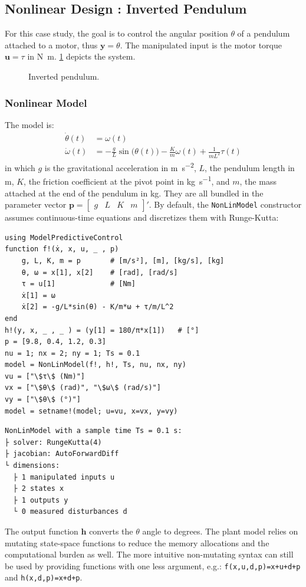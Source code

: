 \subsection{Nonlinear Design : Inverted Pendulum}
\label{sec.nonlinear_design}

For this case study, the goal is to control the angular position $\theta$ of a pendulum attached to a motor, thus $\mathbf{y} = \theta$. The manipulated input is the motor torque $\mathbf{u} = \tau$ in \si{\newton\meter}. \cref{fig:pendulum} depicts the system. 

\begin{figure}[ht]
    \centering
    
    \caption{Inverted pendulum.}\label{fig:pendulum}
\end{figure}

\subsubsection{Nonlinear Model}

The model is:
\begin{align}
\dot{\theta}(t) &= \omega(t) \\
\dot{\omega}(t) &= -\frac{g}{L}\sin\big(\theta(t)\big) -\frac{K}{m}\omega(t) + \frac{1}{m L^2}\tau(t) \label{eq.pendulum_speed}
\end{align}
in which $g$ is the gravitational acceleration in \si{\meter\per\second\squared}, $L$, the pendulum length in \si{\meter}, $K$, the friction coefficient at the pivot point in \si{\kilogram\per\second}, and $m$, the mass attached at the end of the pendulum in \si{\kilogram}. They are all bundled in the parameter vector $\mathbf{p}=[\begin{smallmatrix}g & L & K & m\end{smallmatrix}]'$. By default, the \texttt{NonLinModel} constructor assumes continuous-time equations and discretizes them with Runge-Kutta:
\begin{verbatim}
using ModelPredictiveControl
function f!(ẋ, x, u, _ , p)
    g, L, K, m = p       # [m/s²], [m], [kg/s], [kg]
    θ, ω = x[1], x[2]    # [rad], [rad/s]
    τ = u[1]             # [Nm]
    ẋ[1] = ω
    ẋ[2] = -g/L*sin(θ) - K/m*ω + τ/m/L^2
end
h!(y, x, _ , _ ) = (y[1] = 180/π*x[1])   # [°]
p = [9.8, 0.4, 1.2, 0.3]
nu = 1; nx = 2; ny = 1; Ts = 0.1
model = NonLinModel(f!, h!, Ts, nu, nx, ny)
vu = ["\$τ\$ (Nm)"]
vx = ["\$θ\$ (rad)", "\$ω\$ (rad/s)"]
vy = ["\$θ\$ (°)"]
model = setname!(model; u=vu, x=vx, y=vy)
\end{verbatim}
\spacerepl\vspace{0.6em}
\begin{verbatim}
NonLinModel with a sample time Ts = 0.1 s:
├ solver: RungeKutta(4)
├ jacobian: AutoForwardDiff
└ dimensions:
  ├ 1 manipulated inputs u
  ├ 2 states x
  ├ 1 outputs y
  └ 0 measured disturbances d
\end{verbatim}
The output function $\mathbf{h}$ converts the $\theta$ angle to degrees. The plant model relies on mutating state-space functions to reduce the memory allocations and the computational burden as well. The more intuitive non-mutating syntax can still be used by providing functions with one less argument, e.g.: \texttt{f(x,u,d,p)=x+u+d+p} and \texttt{h(x,d,p)=x+d+p}.

